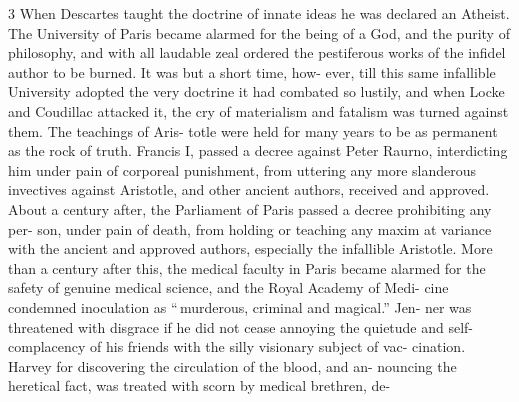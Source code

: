 \documentclass[10pt]{article}
\begin{document}
\begin{multicols}{3}
	When Descartes taught the doctrine of innate ideas he was declared an\linebreak
	Atheist. The University of Paris became alarmed for the being of a
	God, and\linebreak
	the purity of philosophy, and with all laudable zeal ordered the
	pestiferous\linebreak
	works of the infidel author to be burned. It was but a short time,
	how-\linebreak
	ever, till this same infallible University adopted the very doctrine
	it had\linebreak
	combated so lustily, and when Locke and Coudillac attacked it, the
	cry of\linebreak
	materialism and fatalism was turned against them. The teachings of
	Aris-\linebreak
	totle were held for many years to be as permanent as the rock of
	truth.\linebreak
	Francis I, passed a decree against Peter Raurno, interdicting him
	under\linebreak
	pain of corporeal punishment, from uttering any more slanderous
	invectives\linebreak
	against Aristotle, and other ancient authors, received and approved.
	About\linebreak
	a century after, the Parliament of Paris passed a decree prohibiting
	any per-\linebreak
	son, under pain of death, from holding or teaching any maxim at
	variance\linebreak
	with the ancient and approved authors, especially the infallible
	Aristotle.\linebreak
	More than a century after this, the medical faculty in Paris became
	alarmed\linebreak
	for the safety of genuine medical science, and the Royal Academy of
	Medi-\linebreak
	cine condemned inoculation as ``\,murderous, criminal and magical.''
	Jen-\linebreak
	ner was threatened with disgrace if he did not cease annoying the
	quietude\linebreak
	and self-complacency of his friends with the silly visionary subject
	of vac-\linebreak
	cination. Harvey for discovering the circulation of the blood, and
	an-\linebreak
	nouncing the heretical fact, was treated with scorn by medical
	brethren, de-\linebreak

\end{multicols}
\end{document}
